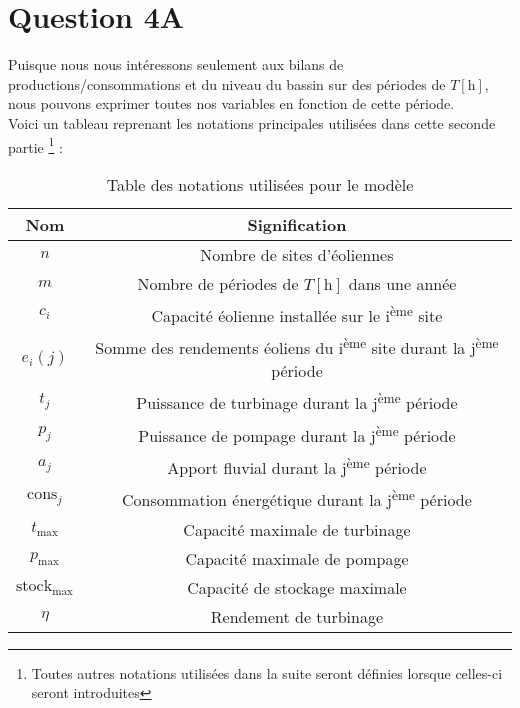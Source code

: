 \documentclass{article}
\newcommand{\unit}[1]{[\mathrm{#1}]}
\begin{document}
\section*{Question 4A}
Puisque nous nous intéressons seulement aux bilans de productions/consommations et du niveau du bassin
sur des périodes de $T \unit{h}$, nous pouvons exprimer toutes nos variables en fonction de cette période.\\
Voici un tableau reprenant les notations principales utilisées dans cette seconde partie \footnote{Toutes autres notations utilisées dans la suite seront définies lorsque celles-ci seront introduites} : 

\begin{table}[h!]
    \centering
    \renewcommand{\arraystretch}{1.5}%
    \begin{tabular}{|c || c |} 
        \hline
        Nom & Signification\\
        \hline\hline
        $n$ & Nombre de sites d'éoliennes\\
        $m$ & Nombre de périodes de $T \unit{h}$ dans une année\\
        $c_i$ & Capacité éolienne installée sur le i\textsuperscript{ème} site\\
        $e_i(j)$ & Somme des rendements éoliens du i\textsuperscript{ème} site durant la j\textsuperscript{ème} période\\
        $t_j$ & Puissance de turbinage durant la j\textsuperscript{ème} période\\
        $p_j$ & Puissance de pompage durant la j\textsuperscript{ème} période\\
        $a_j$ & Apport fluvial durant la j\textsuperscript{ème} période\\
        $\mathrm{cons}_j$ & Consommation énergétique durant la j\textsuperscript{ème} période\\
        $t_\mathrm{max}$ & Capacité maximale de turbinage\\
        $p_\mathrm{max}$ & Capacité maximale de pompage\\
        $\mathrm{stock}_\mathrm{max}$ & Capacité de stockage maximale\\
        $\eta$ & Rendement de turbinage\\
        \hline
    \end{tabular}
    \caption{Table des notations utilisées pour le modèle}
    \label{table:notations}
\end{table}
\end{document}
